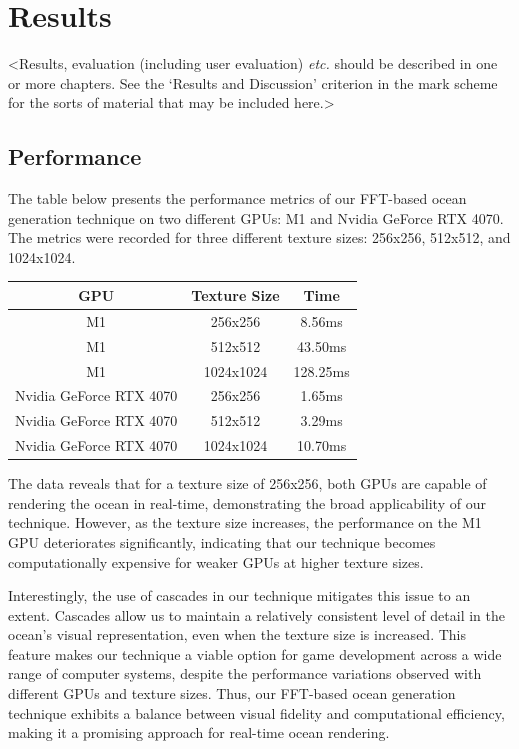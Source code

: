 \justifying
\chapter{Results}
\label{chapter3}

<Results, evaluation (including user evaluation) {\em etc.} should be described in one or more chapters. See the `Results and Discussion' criterion in the mark scheme for the sorts of material that may be included here.>
\section{Performance}

The table below presents the performance metrics of our FFT-based ocean generation technique on two different GPUs: M1 and Nvidia GeForce RTX 4070. The metrics were recorded for three different texture sizes: 256x256, 512x512, and 1024x1024.

\begin{table}[h]
    \centering
    \begin{tabular}{|c|c|c|}
        \hline
        \textbf{GPU} & \textbf{Texture Size} & \textbf{Time} \\
        \hline
        M1 & 256x256 & 8.56ms \\
        \hline
        M1 & 512x512 & 43.50ms \\
        \hline
        M1 & 1024x1024 & 128.25ms \\
        \hline
        Nvidia GeForce RTX 4070 & 256x256 & 1.65ms \\
        \hline
        Nvidia GeForce RTX 4070 & 512x512 & 3.29ms \\
        \hline
        Nvidia GeForce RTX 4070  & 1024x1024 & 10.70ms \\
        \hline
    \end{tabular}
\end{table}

The data reveals that for a texture size of 256x256, both GPUs are capable of rendering the ocean in real-time, demonstrating the broad applicability of our technique. However, as the texture size increases, the performance on the M1 GPU deteriorates significantly, indicating that our technique becomes computationally expensive for weaker GPUs at higher texture sizes.

Interestingly, the use of cascades in our technique mitigates this issue to an extent. Cascades allow us to maintain a relatively consistent level of detail in the ocean’s visual representation, even when the texture size is increased. This feature makes our technique a viable option for game development across a wide range of computer systems, despite the performance variations observed with different GPUs and texture sizes. Thus, our FFT-based ocean generation technique exhibits a balance between visual fidelity and computational efficiency, making it a promising approach for real-time ocean rendering.

